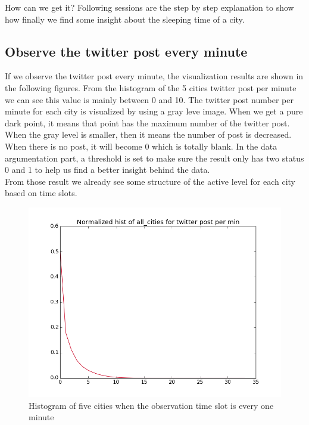 \documentclass[a4paper,12pt]{article}
\begin{document}
How can we get it? Following sessions are the step by step explanation to show how finally we find some insight about the sleeping time of a city.\\

\subsection{Observe the twitter post every minute}
If we observe the twitter post every minute, the visualization results are shown in the following figures. From the histogram of the 5 cities twitter post per minute we can see this value is mainly between 0 and 10.  The twitter post number per minute for each city is visualized by using a gray leve image. When we get a pure dark point, it means that point has the maximum number of the twitter post. When the gray level is smaller, then it means the number of post is decreased. When there is no post, it will become 0 which is totally blank.  In the data argumentation part, a threshold is set to make sure the result only has two status 0 and 1 to help us find a better insight behind the data.\\

From those result we already see some structure of the active level for each city based on time slots. \\




\begin{figure}[H]
  \begin{center}
      \includegraphics[scale=0.8]{all_citieshisto.png}
\end{center}
\caption{Histogram of five cities when the observation time slot is every one minute}
 \label {fig:2}
 \end{figure}
\end{document}
